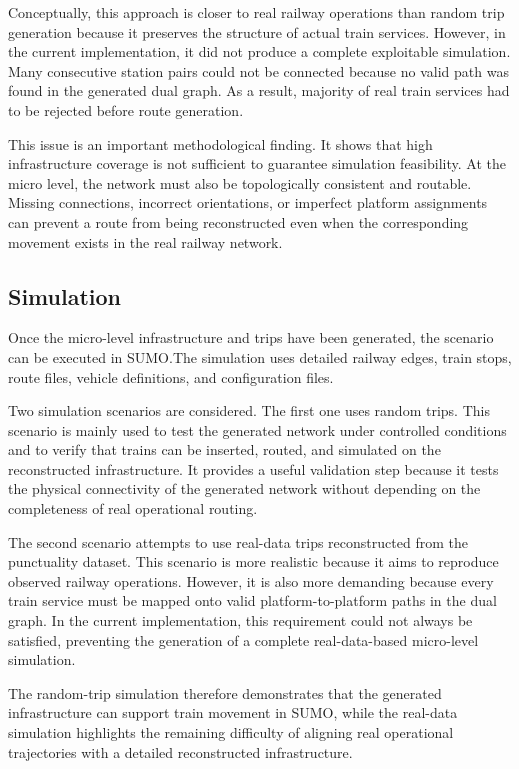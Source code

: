 Conceptually, this approach is closer to real railway operations than random trip generation because it preserves the 
structure of actual train services. However, in the current implementation, it did not produce a complete exploitable 
simulation. Many consecutive station pairs could not be connected because no valid path was found in the generated dual 
graph. As a result, majority of real train services had to be rejected before route generation.

This issue is an important methodological finding. It shows that high infrastructure coverage is not sufficient to 
guarantee simulation feasibility. At the micro level, the network must also be topologically consistent and routable. 
Missing connections, incorrect orientations, or imperfect platform assignments can prevent a route from being 
reconstructed even when the corresponding movement exists in the real railway network.

\subsection{Simulation}
Once the micro-level infrastructure and trips have been generated, the scenario can be executed in SUMO.\@ The simulation 
uses detailed railway edges, train stops, route files, vehicle definitions, and configuration files.

Two simulation scenarios are considered. The first one uses random trips. This scenario is mainly used to test the 
generated network under controlled conditions and to verify that trains can be inserted, routed, and simulated on the 
reconstructed infrastructure. It provides a useful validation step because it tests the physical connectivity of the 
generated network without depending on the completeness of real operational routing.

The second scenario attempts to use real-data trips reconstructed from the punctuality dataset. This scenario is more 
realistic because it aims to reproduce observed railway operations. However, it is also more demanding because every train 
service must be mapped onto valid platform-to-platform paths in the dual graph. In the current implementation, this 
requirement could not always be satisfied, preventing the generation of a complete real-data-based micro-level simulation.

The random-trip simulation therefore demonstrates that the generated infrastructure can support train movement in SUMO, 
while the real-data simulation highlights the remaining difficulty of aligning real operational trajectories with a 
detailed reconstructed infrastructure.

